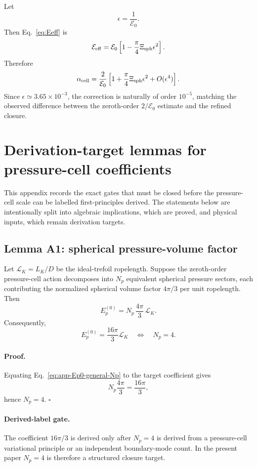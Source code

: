 \documentclass[11pt]{article}
\newcommand{\Ezero}{\mathcal E_0}
\newcommand{\Eeff}{\mathcal E_{\rm eff}}
\newcommand{\Xisph}{\Xi_{\rm sph}}
\newcommand{\alphacell}{\alpha_{\rm cell}}
\begin{document}
Let
\[
  \epsilon=\frac{1}{\Ezero}.
\]
Then Eq.~\eqref{eq:Eeff} is
\[
  \Eeff
  =
  \Ezero
  \left[
  1-\frac{\pi}{4}\Xisph\epsilon^2
  \right].
\]
Therefore
\[
  \alphacell
  =
  \frac{2}{\Ezero}
  \left[
  1+\frac{\pi}{4}\Xisph\epsilon^2
  +O(\epsilon^4)
  \right].
\]
Since \(\epsilon\simeq3.65\times10^{-3}\), the correction is naturally of order
\(10^{-5}\), matching the observed difference between the zeroth-order
\(2/\Ezero\) estimate and the refined closure.


\section{Derivation-target lemmas for pressure-cell coefficients}
\label{app:pressure-coefficient-targets}

This appendix records the exact gates that must be closed before the
pressure-cell scale can be labelled first-principles derived.  The statements
below are intentionally split into algebraic implications, which are proved,
and physical inputs, which remain derivation targets.

\subsection{Lemma A1: spherical pressure-volume factor}

Let \(\mathcal L_K=L_K/D\) be the ideal-trefoil ropelength.  Suppose the
zeroth-order pressure-cell action decomposes into \(N_p\) equivalent spherical
pressure sectors, each contributing the normalized spherical volume factor
\(4\pi/3\) per unit ropelength.  Then
\begin{equation}
  E_p^{(0)}
  =
  N_p\,\frac{4\pi}{3}\,\mathcal L_K .
  \label{eq:app-Ep0-general-Np}
\end{equation}
Consequently,
\begin{equation}
  E_p^{(0)}
  =
  \frac{16\pi}{3}\mathcal L_K
  \quad\Longleftrightarrow\quad
  N_p=4.
  \label{eq:app-Ep0-Np4}
\end{equation}

\paragraph{Proof.}
Equating Eq.~\eqref{eq:app-Ep0-general-Np} to the target coefficient gives
\[
  N_p\frac{4\pi}{3}=\frac{16\pi}{3},
\]
hence \(N_p=4\). \(\square\)

\paragraph{Derived-label gate.}
The coefficient \(16\pi/3\) is derived only after \(N_p=4\) is derived from a
pressure-cell variational principle or an independent boundary-mode count.  In
the present paper \(N_p=4\) is therefore a structured closure target.
\end{document}

